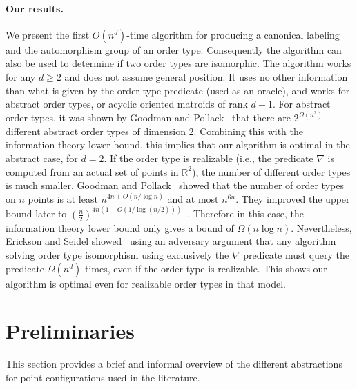 \documentclass[leqno,12pt]{article}
\def\R{\mathbb{R}}
\begin{document}
\paragraph{Our results.}
We present the first $O(n^d)$-time algorithm for producing a 
canonical labeling and the automorphism
group of an order type. Consequently the algorithm can also be used to
determine if two
order types are isomorphic. The algorithm works for any $d\geq 2$ and
does not assume general position. 
It uses no other information than what is given by the order type
predicate (used as an oracle), and works for abstract order types, or
acyclic oriented matroids of rank $d{+}1$.
For abstract order types, it was shown by Goodman and
Pollack~\cite{goodman_pollack_83_sorting} that there are
$2^{\Omega(n^2)}$ different abstract order types of dimension
$2$. Combining this with the information theory lower bound, this
implies that our algorithm is optimal in the abstract case, for
$d=2$. 
If the order type is realizable (i.e., the predicate $\nabla$ is
computed from an actual set of points in $\R^2$), the number of
different order types is much smaller. Goodman and
Pollack~\cite{goodman_pollack_86_upper_bounds} showed that the number
of order types on $n$ points is at least $n^{4n+O(n/\log n)}$ and at
most $n^{6n}$. They improved the upper bound later to
$\left(\frac{n}{2}\right)^{4n(1+O(1/\log(n/2)))}$~\cite{goodman_pollack_91_survey}.
Therefore in this case, the information theory lower bound only gives
a bound of  $\Omega(n\log n)$.
Nevertheless, 
Erickson and Seidel
showed~\cite{DBLP:journals/dcg/EricksonS95,DBLP:journals/dcg/EricksonS97}
using an adversary argument that any algorithm solving order type
isomorphism 
using exclusively the $\nabla$ predicate must query the predicate
$\Omega(n^d)$ times, even if the order type is realizable. 
This shows our algorithm is optimal even for realizable order types in
that model.


\section{Preliminaries}\label{sec:preliminaries}


This section provides a brief and informal overview of the different abstractions for point configurations used in the literature. \\
\end{document}
